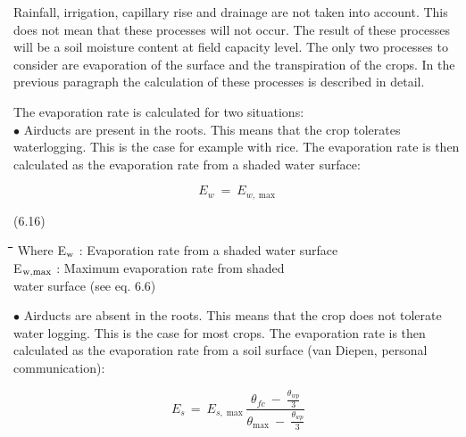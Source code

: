 \documentclass[11pt]{article}
\begin{document}
 \bigskip
Rainfall, irrigation, capillary rise and drainage are not taken into account. This does not
mean that these processes will not occur. The result of these processes will be a soil
moisture content at field capacity level. The only two processes to consider are evapora\-tion of the surface and the transpiration of the crops. In the previous paragraph the
calculation of these processes is described in detail.

\bigskip
\bigskip
The evaporation rate is calculated for two situations:\\
$\bullet$ Airducts are present in the roots. This means that the crop tolerates waterlog\-ging. This
is the case for example with rice. The evaporation rate is then calculated as the evapora\-tion rate from a shaded water surface:

\begin{displaymath}
E _{w} ~=~ E _{w, \max } 
\end{displaymath}

 \bigskip
\strut\hfill (6.16)
\nwln
\begin{tabbing}
\hspace{1.27cm}\=\hspace{1.27cm}\=\hspace{1.27cm}\=\hspace{1.27cm}\=%
\hspace{1.27cm}\=\hspace{1.27cm}\=\hspace{1.27cm}\=\hspace{1.27cm}\=%
\hspace{1.27cm}\=\hspace{1.27cm}\=\kill
Where\> \> E$_{{\rm w}}$\> : Evaporation rate from a shaded water surface\> \> \> \> \> \> \> [cm d$^{{\rm -1}}$]\\
\>\> E$_{{\rm w,max}}$\> : Maximum evaporation rate from shaded \\
\>\> \>   water surface (see eq. 6.6)\> \> \> \> \> \> \> [cm d$^{{\rm -1}}$]
\end{tabbing}

 \bigskip
$\bullet$ Airducts are absent in the roots. This means that the crop does not tolerate water
logging. This is the case for most crops. The evaporation rate is then calculated as the
evaporation rate from a soil surface (van Diepen, personal communication):  

\begin{displaymath}
E _{s~} =~ E _{s,\max } {\frac{ \theta  _{fc} ~-~ {{\frac{\theta  _{wp} }{3}}} }{\theta  _{\max } ~-~{{\frac{\theta  _{wp} }{3}}} }}
\end{displaymath}
\end{document}
